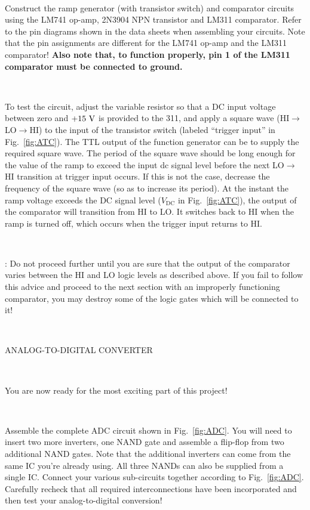 \documentclass[12pt,oneside,openany,letterpaper]{article}
\begin{document}
~

\noindent Construct the ramp generator (with transistor switch) and comparator circuits using the LM741 op-amp, 2N3904 NPN transistor and LM311 comparator. Refer to the pin diagrams shown in the data sheets when assembling your circuits. Note that the pin assignments are different for the LM741 op-amp and the LM311 comparator!  {\bf Also note that, to function properly, pin 1 of the LM311 comparator must be connected to ground.}

~

\noindent To test the circuit, adjust the variable resistor so that a DC input voltage between zero and $+15\rm\ V$ is provided to the 311, and apply a square wave (HI$\to$LO$\to$HI) to the input of the transistor switch (labeled ``trigger input'' in Fig.~\ref{fig:ATC}). The TTL output of the function generator can be to supply the required square wave.  The period of the square wave should be long enough for the value
of the ramp to exceed the input dc signal level before the next LO$\to$HI transition at trigger input occurs. If this is not the case, decrease the frequency of the square wave (so as to increase its period).  At the instant the ramp voltage exceeds the DC signal level ($V_\mathrm{DC}$ in Fig.~\ref{fig:ATC}), the output of the comparator will transition from HI to LO. It switches back to HI when the ramp is turned off, which occurs when the trigger input returns to HI.

~

: Do not proceed further until you are sure that the output of the comparator varies between the HI and LO logic levels as described above. If you fail to follow this advice and proceed to the next section with an improperly functioning comparator, you may destroy some of the logic gates which will be connected to it!

~

\noindent ANALOG-TO-DIGITAL CONVERTER

~

\noindent You are now ready for the most exciting part of this project!

~

\noindent Assemble the complete ADC circuit shown in Fig.~\ref{fig:ADC}.  You will need to insert two more inverters, one NAND gate and assemble a flip-flop from two additional NAND gates.  Note that the additional inverters can come from the same IC you're already using.  All three NANDs can also be supplied from a single IC.  Connect your various sub-circuits together according to Fig.~\ref{fig:ADC}.  Carefully recheck that all required interconnections have been incorporated and then test your analog-to-digital conversion!
\end{document}

